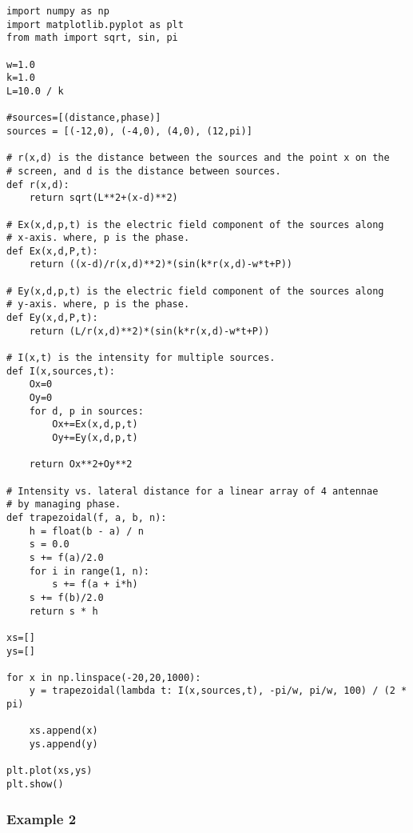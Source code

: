 \begin{Verbatim}[fontsize=\small,baselinestretch=0.9]
import numpy as np
import matplotlib.pyplot as plt
from math import sqrt, sin, pi

w=1.0
k=1.0
L=10.0 / k

#sources=[(distance,phase)]
sources = [(-12,0), (-4,0), (4,0), (12,pi)]

# r(x,d) is the distance between the sources and the point x on the
# screen, and d is the distance between sources.
def r(x,d):
    return sqrt(L**2+(x-d)**2)
    
# Ex(x,d,p,t) is the electric field component of the sources along
# x-axis. where, p is the phase.
def Ex(x,d,P,t):
    return ((x-d)/r(x,d)**2)*(sin(k*r(x,d)-w*t+P))

# Ey(x,d,p,t) is the electric field component of the sources along
# y-axis. where, p is the phase.
def Ey(x,d,P,t):
    return (L/r(x,d)**2)*(sin(k*r(x,d)-w*t+P))
       
# I(x,t) is the intensity for multiple sources.
def I(x,sources,t):
    Ox=0
    Oy=0
    for d, p in sources:
        Ox+=Ex(x,d,p,t)
        Oy+=Ey(x,d,p,t)
    
    return Ox**2+Oy**2
        
# Intensity vs. lateral distance for a linear array of 4 antennae
# by managing phase.
def trapezoidal(f, a, b, n):
    h = float(b - a) / n
    s = 0.0
    s += f(a)/2.0
    for i in range(1, n):
        s += f(a + i*h)
    s += f(b)/2.0
    return s * h

xs=[]
ys=[]

for x in np.linspace(-20,20,1000):
    y = trapezoidal(lambda t: I(x,sources,t), -pi/w, pi/w, 100) / (2 * pi)
   
    xs.append(x)
    ys.append(y)

plt.plot(xs,ys)
plt.show()   
\end{Verbatim}


\subsubsection{Example 2}\label{code:phase_left}

